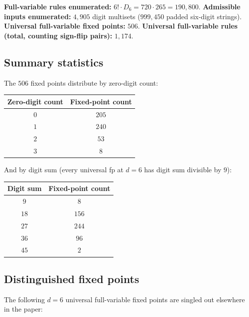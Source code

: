 \documentclass[11pt,letterpaper]{article}
\theoremstyle{paperstyle}
\theoremstyle{paperstyledef}
\theoremstyle{paperstylerem}
\begin{document}
\textbf{Full-variable rules enumerated:}
\(6! \cdot D_6 = 720 \cdot 265 = 190{,}800\). \textbf{Admissible inputs
enumerated:} \(4{,}905\) digit multisets (\(999{,}450\) padded six-digit
strings). \textbf{Universal full-variable fixed points:} \(506\).
\textbf{Universal full-variable rules (total, counting sign-flip
pairs):} \(1{,}174\).

\hypertarget{a.4.1-summary-statistics}{%
\subsection{Summary statistics}\label{a.4.1-summary-statistics}}

The \(506\) fixed points distribute by zero-digit count:

\begin{longtable}[]{@{}cc@{}}
\toprule\noalign{}
Zero-digit count & Fixed-point count \\
\midrule\noalign{}
\endhead
\bottomrule\noalign{}
\endlastfoot
\(0\) & \(205\) \\
\(1\) & \(240\) \\
\(2\) & \(53\) \\
\(3\) & \(8\) \\
\end{longtable}

And by digit sum (every universal fp at \(d = 6\) has digit sum
divisible by \(9\)):

\begin{longtable}[]{@{}cc@{}}
\toprule\noalign{}
Digit sum & Fixed-point count \\
\midrule\noalign{}
\endhead
\bottomrule\noalign{}
\endlastfoot
\(9\) & \(8\) \\
\(18\) & \(156\) \\
\(27\) & \(244\) \\
\(36\) & \(96\) \\
\(45\) & \(2\) \\
\end{longtable}

\hypertarget{a.4.2-distinguished-fixed-points}{%
\subsection{Distinguished fixed points}\label{a.4.2-distinguished-fixed-points}}

The following \(d = 6\) universal full-variable fixed points are singled
out elsewhere in the paper:
\end{document}
